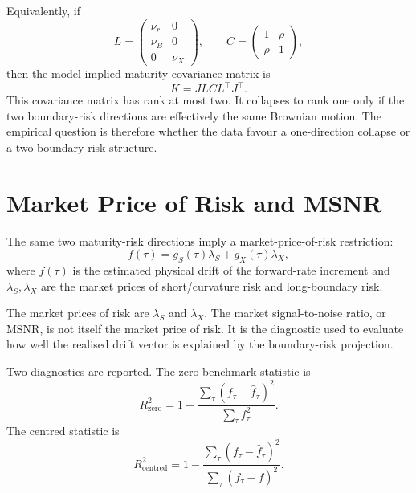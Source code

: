 \documentclass[11pt,oneside]{book}
\begin{document}
Equivalently, if
\[
L
=
\begin{pmatrix}
\nu_r & 0\\
\nu_B & 0\\
0 & \nu_X
\end{pmatrix},
\qquad
C
=
\begin{pmatrix}
1 & \rho\\
\rho & 1
\end{pmatrix},
\]
then the model-implied maturity covariance matrix is
\begin{equation}
K
=
JLC L^\top J^\top.
\label{eq:model-covariance}
\end{equation}
This covariance matrix has rank at most two. It collapses to rank one only if the two boundary-risk directions are effectively the same Brownian motion. The empirical question is therefore whether the data favour a one-direction collapse or a two-boundary-risk structure.

\section{Market Price of Risk and MSNR}

The same two maturity-risk directions imply a market-price-of-risk restriction:
\begin{equation}
f(\tau)
=
g_S(\tau)\lambda_S
+
g_X(\tau)\lambda_X,
\label{eq:mpr-restriction}
\end{equation}
where \(f(\tau)\) is the estimated physical drift of the forward-rate increment and \(\lambda_S,\lambda_X\) are the market prices of short/curvature risk and long-boundary risk.

The market prices of risk are \(\lambda_S\) and \(\lambda_X\). The market signal-to-noise ratio, or MSNR, is not itself the market price of risk. It is the diagnostic used to evaluate how well the realised drift vector is explained by the boundary-risk projection.

Two diagnostics are reported. The zero-benchmark statistic is
\begin{equation}
R^2_{\mathrm{zero}}
=
1-
\frac{
\sum_\tau
\left(f_\tau-\widehat f_\tau\right)^2
}{
\sum_\tau f_\tau^2
}.
\label{eq:msnr-zero}
\end{equation}
The centred statistic is
\begin{equation}
R^2_{\mathrm{centred}}
=
1-
\frac{
\sum_\tau
\left(f_\tau-\widehat f_\tau\right)^2
}{
\sum_\tau
\left(f_\tau-\bar f\right)^2
}.
\label{eq:msnr-centred}
\end{equation}
\end{document}

